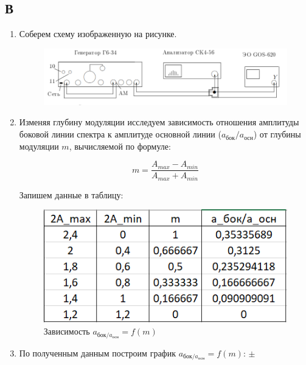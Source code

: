 \documentclass[a4paper, 12pt]{article}%
\begin{document}
\newpage

\subsection*{В}

\begin{enumerate}

\item Соберем схему изображенную на рисунке.

\begin{figure}[h!]
\centering
\includegraphics[scale=0.6]{images/scheme2.png}
\label{fig:Image1}
\end{figure}

\item Изменяя глубину модуляции исследуем зависимость отношения амплитуды боковой линии спектра к амплитуде основной линии ($a_{\text{бок}}/a_{\text{осн}}$) от глубины модуляции $m$, вычисляемой по формуле:

\[m = \frac{A_{max} - A_{min}}{A_{max} + A_{min}}\]

Запишем данные в таблицу:

\begin{figure}[h!]
\centering
\includegraphics[scale=1.2]{images/table3.png}
\caption{Зависимость $a_{\text{бок}/a_{\text{осн}}} = f(m)$}
\label{fig:Image1}
\end{figure}

\item По полученным данным построим график $a_{\text{бок}/a_{\text{осн}}} = f(m)$: $\pm$


\end{enumerate}
\end{document}
